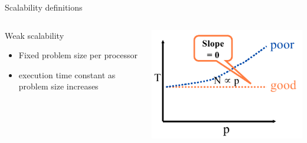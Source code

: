 \begin{frame}{Scalability definitions}
  \begin{columns}
    \begin{column}{0.5\textwidth}
      {\large Weak scalability}
      \begin{itemize}
      \item Fixed problem size per processor
      \item execution time constant as problem size increases
      \end{itemize}
    \end{column}
    \begin{column}{0.5\textwidth}
      \includegraphics[width=\textwidth]{figures/KeyesWeakScaling.png}
    \end{column}
  \end{columns}
\end{frame}

